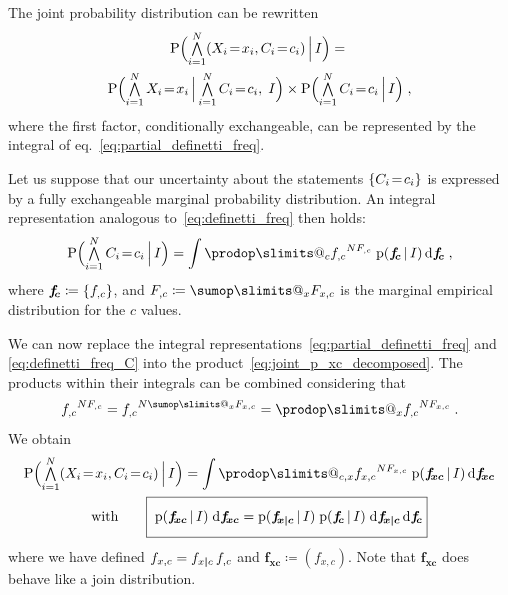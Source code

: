 \documentclass[\ifafour a4paper,12pt,\else a5paper,10pt,\fi%
onecolumn,oneside,article,%
british%
]{memoir}
\makeatletter
\theoremstyle{remark}
\theoremstyle{innote}
\def\sum{\DOTSI\sumop\slimits@}
\def\prod{\DOTSI\prodop\slimits@}
\newcommand*{\di}{\mathrm{d}}%
\newcommand*{\defd}{\coloneqq}
\newcommand*{\Land}{\mathop{\textstyle\bigwedge}}
\DeclarePairedDelimiter\set{\{}{\}}
\newcommand*{\pf}{\mathrm{p}}%
\newcommand*{\p}{\mathrm{P}}%
\renewcommand*{\|}[1][]{\nonscript\,#1\vert\nonscript\,\mathopen{}}
\newcommand*{\eqn}{eq.}%
\renewcommand*{\=}{\TextOrMath\texteq\eq}
\newcommand*{\X}[1]{X_{#1}}
\newcommand*{\x}[1]{x_{#1}}
\newcommand*{\C}[1]{C_{#1}}
\newcommand*{\cc}[1]{c_{#1}}
\newcommand*{\fxc}{\bm{f_{\!x\bcond c}}}
\newcommand*{\fc}{\bm{f_{\!c}}}
\newcommand*{\fj}{\bm{f_{\!xc}}}
\newcommand*{\bcond}[1][]{\nonscript\,#1\bm{\vert}\nonscript\;\mathopen{}}
\makeatother
\begin{document}
The joint probability distribution can be rewritten
\begin{multline}
  \label{eq:joint_p_xc_decomposed}
  \p\Bigl(\Land_{i=1}^{N} (\X{i}\=\x{i}, \C{i}\=\cc{i}) \|[\Big] I\Bigr) ={}\\
  \p\Bigl(\Land_{i=1}^{N} \X{i}\=\x{i} \|[\Big] \Land_{i=1}^{N} \C{i}\=\cc{i},\; I\Bigr) \times
  \p\Bigl(\Land_{i=1}^{N} \C{i}\=\cc{i} \|[\Big] I\Bigr)
  \;,
\end{multline}
where the first factor, conditionally exchangeable, can be represented by
the integral of \eqn~\eqref{eq:partial_definetti_freq}.

Let us suppose that our uncertainty about the statements
$\set{\C{i}\=\cc{i}}$ is expressed by a fully exchangeable marginal
probability distribution. An integral representation analogous
to~\eqref{eq:definetti_freq} then holds:
\begin{equation}
  \label{eq:definetti_freq_C}
  \p\Bigl( \Land_{i=1}^{N}\C{i}\=\cc{i} \|[\Big] I\Bigr) =
\int\prod_{c} {f_{,c}}^{N F_{,c}}\;   \pf(\fc \| I)\,\di\fc \;,
\end{equation}
where $\fc \defd \set{f_{,c}}$, and $F_{,c} \defd \sum_{x} F_{x,c}$ is the
marginal empirical distribution for the $c$ values.


We can now replace the integral
representations~\eqref{eq:partial_definetti_freq} and
\eqref{eq:definetti_freq_C} into the
product~\eqref{eq:joint_p_xc_decomposed}. The products within their
integrals can be combined considering that
\begin{equation}
  \label{eq:develop_prodfc}
  {f_{,c}}^{N F_{,c}} = {f_{,c}}^{N \sum_{x}F_{x,c}} =
  \prod_{x} {f_{,c}}^{N F_{x,c}} \;.
\end{equation}
We obtain
\begin{subequations}
  \label{eq:result}
  \begin{gather}
     \p\Bigl(\Land_{i=1}^{N} (\X{i}\=\x{i}, \C{i}\=\cc{i}) \|[\Big] I\Bigr) =
\int\prod_{c,x} {f_{x,c}}^{N F_{x, c}}\;  \pf(\fj\|I)\,\di\fj
\\
  \label{eq:factorizable}
\text{with}\qquad \boxed{\;\vphantom{\int}\pf(\fj\|I)\;\di\fj =
\pf(\fxc \| I)  \;
\pf(\fc \| I) \;\di\fxc\,\di\fc }
\end{gather}
\end{subequations}
where we have defined $f_{x,c} = f_{x \bcond c}\, f_{,c}$ and
$\fj \defd (f_{x,c})$. Note that $\fj$ does behave like a join
distribution.
\end{document}

